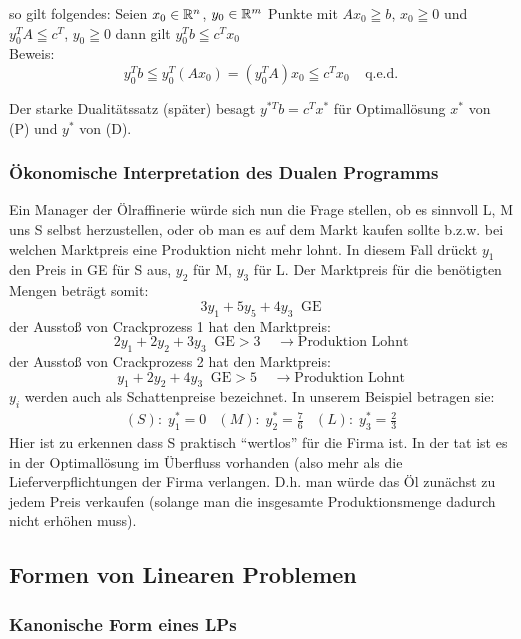 so gilt folgendes: Seien $x_{0} \in \mathbb{R}^{n}$, $ y_{0} \in \mathbb{R}^{m}$ Punkte
mit $A x_{0} \geqq b $, $x_{0} \geqq 0$ und $y_{0}^{T}A \leqq c^{T}$,
$y_{0} \geqq 0$ dann gilt $y_{0}^{T}b \leqq c^{T} x_{0}$\\
Beweis:
\[y_{0}^{T}b \leqq y_{0}^{T}(A x_{0}) = (y_{0}^{T}A)x_{0} \leqq c^{T}x_{0}
\; \; \; \; \mbox{q.e.d.}\] 

Der starke Dualitätssatz (später) besagt $y^{*T}b =c^{T}x^{*}$ für
Optimallösung $x^{*}$ von (P) und $y^{*}$ von (D).

\subsubsection{Ökonomische Interpretation des Dualen Programms}

Ein Manager der Ölraffinerie würde sich nun die Frage stellen, ob es sinnvoll
L, M uns S selbst herzustellen, oder ob man es auf dem Markt kaufen sollte 
b.z.w.  bei welchen Marktpreis eine Produktion nicht mehr lohnt. In diesem Fall
drückt $y_{1}$ den Preis in GE für S aus, $y_{2}$ für M, $y_{3}$ für L. Der
Marktpreis für die benötigten Mengen beträgt somit:
\[3y_{1} + 5y_{5} + 4y_{3} \; \; \mbox{GE}\]
der Ausstoß von Crackprozess 1 hat den Marktpreis:
\[2y_{1}+2y_{2}+3y_{3} \; \; \mbox{GE} > 3 \;\;\;\; \rightarrow \mbox{Produktion Lohnt}\]
der Ausstoß von Crackprozess 2 hat den Marktpreis:
\[y_{1}+2y_{2}+4y_{3} \;\; \mbox{GE} > 5 \;\;\;\; \rightarrow \mbox{Produktion Lohnt}\]
$y_{i}$ werden auch als Schattenpreise bezeichnet. In unserem Beispiel
betragen sie:
\[\begin{array}{lll}(S):\; y_{1}^{*}=0& (M):\; y_{2}^{*} =
\frac{7}{6}&(L):\;
y_{3}^{*} = \frac{2}{3}
\end{array}\]
Hier ist zu erkennen dass S praktisch "`wertlos"' für die Firma ist. In der
tat ist es in der Optimallösung im Überfluss vorhanden (also mehr als die
Lieferverpflichtungen der Firma verlangen. D.h. man würde das Öl zunächst
zu jedem Preis verkaufen (solange man die insgesamte Produktionsmenge
dadurch nicht erhöhen muss).

\subsection{Formen von Linearen Problemen \label{FormenLP}}

\subsubsection{Kanonische Form eines LPs}

